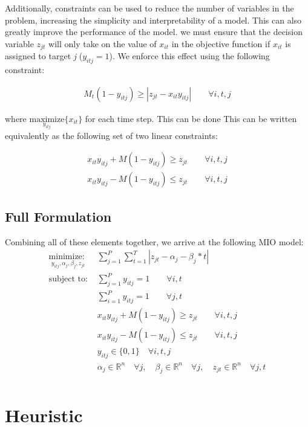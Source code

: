 \documentclass[journal]{IEEEtran}
\begin{document}
 Additionally, constraints can be used to reduce the number of variables in the problem, increasing the simplicity and interpretability of a model. This can also greatly improve the performance of the model. we must ensure that the decision variable $z_{jt}$ will only take on the value of $x_{it}$ in the objective function if $x_{it}$ is assigned to target \textit{j} ($y_{itj} = 1$). We enforce this effect using the following constraint:

\begin{align}
M_{t}(1-y_{itj}) \geq |z_{jt} - x_{it}y_{itj}| \qquad \forall i,t,j
\end{align}

where $\underset{y_{itj}}{\text{maximize}}\{x_{it}\}$ for each time step. This can be done 
This can be written equivalently as the following set of two linear constraints:

\begin{align}
x_{it}y_{itj} + M(1-y_{itj}) \geq z_{jt} \qquad \forall i,t,j\\
x_{it}y_{itj} - M(1-y_{itj}) \leq z_{jt} \qquad \forall i,t,j
\end{align}

\subsection{Full Formulation}
Combining all of these elements together, we arrive at the following MIO model:
\begin{align*}
\underset{y_{itj}, \alpha_{j}, \beta_{j}, z_{jt}}{\text{minimize: }} & \sum_{j=1}^{P} \sum_{t=1}^{T} |z_{jt} - \alpha_{j} - \beta_{j}*t| \\
\text{subject to: }	& \sum_{j=1}^{P} y_{itj} = 1 \qquad \forall i,t\\
				& \sum_{i=1}^{P} y_{itj} = 1 \qquad \forall j,t\\
				& x_{it}y_{itj} + M(1-y_{itj}) \geq z_{jt} \qquad \forall i,t,j\\
				& x_{it}y_{itj} - M(1-y_{itj}) \leq z_{jt} \qquad \forall i,t,j\\
			 	& y_{itj} \in \{0,1\} \quad \forall i,t,j\\
				& \alpha_{j} \in \mathbb{R}^n \quad \forall j,\quad \beta_{j} \in \mathbb{R}^n \quad \forall j, \quad z_{jt} \in \mathbb{R}^n \quad \forall j,t\\
\end{align*}


\section{Heuristic}
\end{document}
